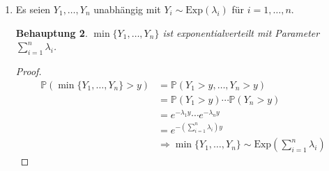 \documentclass[a4paper]{scrartcl}
\newtheorem*{behaupt}{Behauptung}
\newcommand{\prob}{\mathbb{P}}
\def \blattnr {4}
\begin{document}
\begin{enumerate}[label=\bfseries \blattnr.\arabic*]
\begin{enumerate}
                \begin{behaupt}
                    Die Exponentialverteilung ist gedächtnislos:
                    Es gilt
                    \begin{equation*}
                        \prob(Y > s + t\ |\ Y > s) = \prob(Y > t)
                        \text{ für }
                        s,t \geq 0
                        \text{ .}
                    \end{equation*}
                \end{behaupt}
                \begin{proof}
                    \begin{equation*}
                        \begin{split}
                            \prob(Y > s + t\ |\ Y > s)
                            &= \frac{\prob(Y > s+t, Y > s)}{\prob(Y > s)} \\
                            &= \frac{\prob(Y > s+t)}{\prob(Y > s)} \\
                            &= \frac{e^{-\lambda (s+t)}}{e^{-\lambda s}} \\
                            &= e^{-\lambda t} \\
                            &= \prob(Y > t)
                        \end{split}
                    \end{equation*}
                \end{proof}

            \item
                Es seien $Y_1, \dotsc, Y_n$ unabhängig mit $Y_i \sim
                \text{Exp}(\lambda_i)$ für $i = 1, \dotsc, n$.
                \begin{behaupt}
                    $\min\{Y_1, \dotsc, Y_n\}$ ist exponentialverteilt mit
                    Parameter $\sum_{i=1}^n \lambda_i$.
                \end{behaupt}
                \begin{proof}
                    \begin{equation*}
                        \begin{split}
                            \prob(\min\{Y_1, \dotsc, Y_n\} > y)
                            &= \prob(Y_1 > y, \dotsc, Y_n > y) \\
                            &= \prob(Y_1 > y) \dotsm \prob(Y_n > y) \\
                            &= e^{-\lambda_1 y} \dotsm e^{-\lambda_n y} \\
                            &= e^{- \left( \sum_{i=1}^n \lambda_i \right) y} \\
                            &\Rightarrow \min\{Y_1, \dotsc, Y_n\} \sim
                            \text{Exp} \left( \sum_{i=1}^n \lambda_i \right)
                        \end{split}
                    \end{equation*}
                \end{proof}


\end{enumerate}
\end{enumerate}
\end{document}
